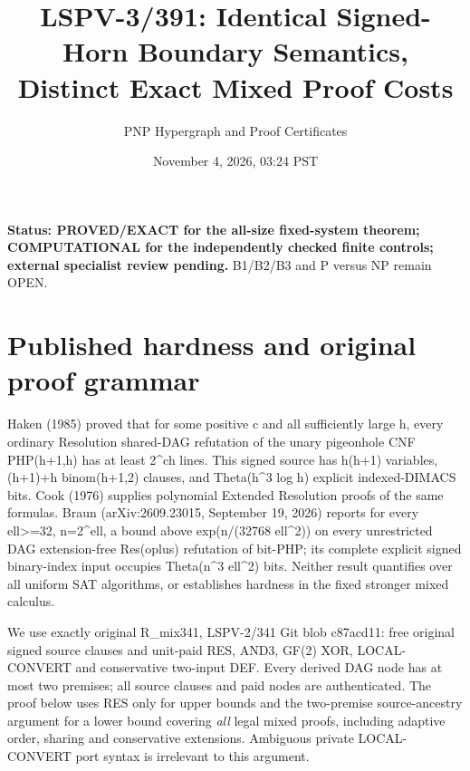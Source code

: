 \documentclass[11pt]{article}
\title{LSPV-3/391: Identical Signed-Horn Boundary Semantics, Distinct Exact Mixed Proof Costs}
\author{PNP Hypergraph and Proof Certificates}
\date{November 4, 2026, 03:24 PST}
\begin{document}
\maketitle
\noindent \textbf{Status: PROVED/EXACT for the all-size fixed-system theorem; COMPUTATIONAL for the independently checked finite controls; external specialist review pending.} B1/B2/B3 and P versus NP remain OPEN.
\section*{Published hardness and original proof grammar}
Haken (1985) proved that for some positive c and all sufficiently large h, every ordinary Resolution shared-DAG refutation of the unary pigeonhole CNF PHP(h+1,h) has at least 2^{ch} lines. This signed source has h(h+1) variables, (h+1)+h binom(h+1,2) clauses, and Theta(h^3 log h) explicit indexed-DIMACS bits. Cook (1976) supplies polynomial Extended Resolution proofs of the same formulas. Braun (arXiv:2609.23015, September 19, 2026) reports for every ell>=32, n=2^ell, a bound above exp(n/(32768 ell^2)) on every unrestricted DAG extension-free Res(oplus) refutation of bit-PHP; its complete explicit signed binary-index input occupies Theta(n^3 ell^2) bits. Neither result quantifies over all uniform SAT algorithms, or establishes hardness in the fixed stronger mixed calculus.

We use exactly original R\_mix341, LSPV-2/341 Git blob c87acd11: free original signed source clauses and unit-paid RES, AND3, GF(2) XOR, LOCAL-CONVERT and conservative two-input DEF. Every derived DAG node has at most two premises; all source clauses and paid nodes are authenticated. The proof below uses RES only for upper bounds and the two-premise source-ancestry argument for a lower bound covering \emph{all} legal mixed proofs, including adaptive order, sharing and conservative extensions. Ambiguous private LOCAL-CONVERT port syntax is irrelevant to this argument.
\end{document}
